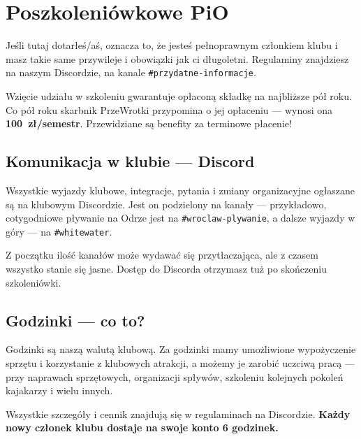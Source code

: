 \section{Poszkoleniówkowe PiO}

Jeśli tutaj dotarłeś/aś, oznacza to, że jesteś pełnoprawnym członkiem klubu i masz takie
same przywileje i obowiązki jak ci długoletni. Regulaminy znajdziesz na naszym Discordzie,
na kanale \texttt{\#przydatne-informacje}.

Wzięcie udziału w szkoleniu gwarantuje opłaconą składkę na najbliższe pół roku.
Co pół roku skarbnik PrzeWrotki przypomina o jej opłaceniu — wynosi ona \textbf{100~zł/semestr}.
Przewidziane są benefity za terminowe płacenie!

\subsection*{Komunikacja w klubie — Discord}

Wszystkie wyjazdy klubowe, integracje, pytania i zmiany organizacyjne ogłaszane są
na klubowym Discordzie. Jest on podzielony na kanały — przykładowo, cotygodniowe pływanie
na Odrze jest na \texttt{\#wroclaw-plywanie}, a dalsze wyjazdy w góry — na \texttt{\#whitewater}.

Z początku ilość kanałów może wydawać się przytłaczająca, ale z czasem wszystko stanie się
jasne. Dostęp do Discorda otrzymasz tuż po skończeniu szkoleniówki.

\subsection*{Godzinki — co to?}

Godzinki są naszą walutą klubową. Za godzinki mamy umożliwione wypożyczenie sprzętu
i korzystanie z klubowych atrakcji, a możemy je zarobić uczciwą pracą — przy naprawach
sprzętowych, organizacji spływów, szkoleniu kolejnych pokoleń kajakarzy i wielu innych.

Wszystkie szczegóły i cennik znajdują się w regulaminach na Discordzie.
\textbf{Każdy nowy członek klubu dostaje na swoje konto 6 godzinek.}

